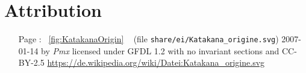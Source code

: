 \chapter{Attribution}
\label{chap:attribution}

\begin{itemize}

        \item[Page \pageref{fig:KatakanaOrigin}:] ~\ref{fig:KatakanaOrigin}
                ~ (file
                \texttt{share/ei/Katakana\_origine.svg}) 2007-01-14 by
                \textit{Pmx} licensed under GFDL 1.2 with no invariant sections
                and CC-BY-2.5
                \url{https://de.wikipedia.org/wiki/Datei:Katakana_origine.svg}


\end{itemize}




